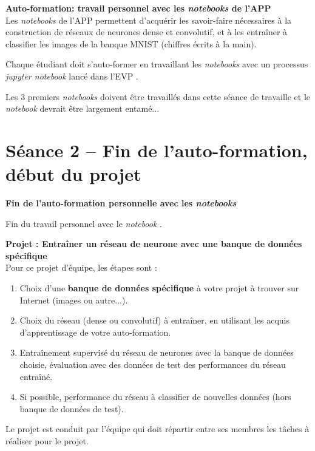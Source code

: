 \documentclass[11pt,french]{article}
\newcommand{\VDB}[1]{\VeryDarkBlue{#1}}
\newcommand{\file}[1]{{\ttfamily \VDB{#1}}}
\begin{document}
\begin {bclogo}[noborder=true, couleurBarre=Chocolate, logo=\bctrombone]{}
  \vspace*{-4mm}\textbf{Auto-formation: travail personnel avec les {\em notebooks} de l'APP}\\[-2mm]

Les {\em notebooks} de l'APP permettent d'acquérir les savoir-faire nécessaires à la construction
de réseaux de neurones dense et convolutif, et à les entraîner à classifier les images de la banque MNIST (chiffres écrits à la main).

Chaque étudiant doit s'auto-former en travaillant les {\em notebooks} avec un processus {\em jupyter notebook} lancé dans l'EVP .

Les 3 premiers {\em notebooks} doivent être travaillés dans cette séance de travaille et le {\em notebook} \file{ML4\_CNN.ipynb} devrait être largement entamé...
\end{bclogo}  

\newpage
\vspace*{-16mm}
\section*{ Séance 2 -- Fin de l'auto-formation, début du projet}

\begin {bclogo}[noborder=true, couleurBarre=Chocolate, logo=\bctrombone]{}
  \vspace*{-4mm}\textbf{Fin de l'auto-formation personnelle avec les {\em notebooks}}
  
  Fin du travail personnel avec le {\em notebook} \file{ML4\_CNN.ipynb}.
\end{bclogo}  

\begin {bclogo}[noborder=true, couleurBarre=Chocolate, logo=\bctrombone]{}
  \vspace*{-4mm}\textbf{Projet : Entraîner un réseau de neurone avec une banque de données spécifique}\\[-2mm]

Pour ce projet d'équipe, les étapes sont :
\begin{enumerate}
\item Choix d'une \textbf{banque de données spécifique} à votre projet à trouver sur Internet (images ou autre...).
\item Choix du réseau (dense ou convolutif) à entraîner, en utilisant les acquis d'apprentissage de votre auto-formation.
\item Entraînement supervisé du réseau de neurones avec la banque de données choisie, évaluation avec des données de test des performances du réseau entraîné.
\item Si possible, performance du réseau à classifier de nouvelles données (hors banque de données de test).  
\end{enumerate}

Le projet est conduit par l'équipe qui doit répartir entre ses membres les tâches à réaliser pour le projet.
\end{bclogo}  
\end{document}
